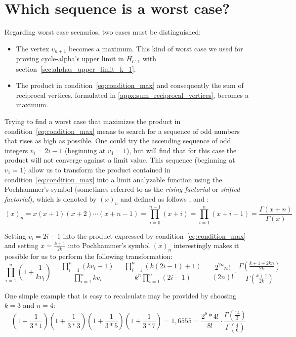 \section{Which sequence is a worst case?}
\label{sec:worstcase_k3}
Regarding worst case scenarios, two cases must be distinguished:
\begin{itemize}
	\item The vertex $v_{n+1}$ becomes a maximum. This kind of worst case we used for proving cycle-alpha's upper limit in $H_{C,1}$ with section~\ref{sec:alphas_upper_limit_k_1}.
	\item The product in condition~\ref{eq:condition_max} and consequently the sum of reciprocal vertices, formulated in \ref{appx:sum_reciprocal_vertices}, becomes a maximum.
\end{itemize}
Trying to find a worst case that maximizes the product in condition~\ref{eq:condition_max} means to search for a sequence of odd numbers that rises as high as possible. One could try the ascending sequence of odd integers $v_i=2i-1$ (beginning at $v_1=1$), but will find that for this case the product will not converge against a limit value. This sequence (beginning at $v_1=1$) allow us to transform the product contained in condition~\ref{eq:condition_max} into a limit analyzable function using the Pochhammer’s symbol (sometimes referred to as the \textit{rising factorial} or \textit{shifted factorial}), which is denoted by $(x)_n$ and defined as follows \cite{Ref_Zwillinger_Kokoska}, \cite[p.~679]{Ref_Brychkov} and \cite[p.~1005]{Ref_Trott}:
\[
(x)_n=x(x+1)(x+2)\cdots(x+n-1)=\prod_{i=0}^{n-1}(x+i)=\prod_{i=1}^{n}(x+i-1)=\frac{\Gamma(x+n)}{\Gamma(x)}
\]

Setting $v_i=2i-1$ into the product expressed by condition~\ref{eq:condition_max} and setting $x=\frac{k+1}{2k}$ into Pochhammer’s symbol $(x)_n$ interestingly makes it possible for us to perform the following transformation:
\begin{equation}
\label{eq:pochhammer}
\prod_{i=1}^{n}\left(1+\frac{1}{kv_i}\right)
=\frac{\prod_{i=1}^{n}(kv_i+1)}{\prod_{i=1}^{n}kv_i}
=\frac{\prod_{i=1}^{n}\left(k(2i-1)+1\right)}{k^n\prod_{i=1}^{n}(2i-1)}
=\frac{2^{2n}n!}{(2n)!}\cdot\frac{\Gamma\left(\frac{k+1+2kn}{2k}\right)}{\Gamma\left(\frac{k+1}{2k}\right)}
\end{equation}

\begin{example}
	One simple example that is easy to recalculate may be provided by choosing $k=3$ and $n=4$:
	\[
	\left(1+\frac{1}{3*1}\right)\left(1+\frac{1}{3*3}\right)\left(1+\frac{1}{3*5}\right)\left(1+\frac{1}{3*7}\right)=1,6555=\frac{2^8*4!}{8!}\cdot\frac{\Gamma(\frac{14}{3})}{\Gamma(\frac{4}{6})}
	\]
\end{example}

